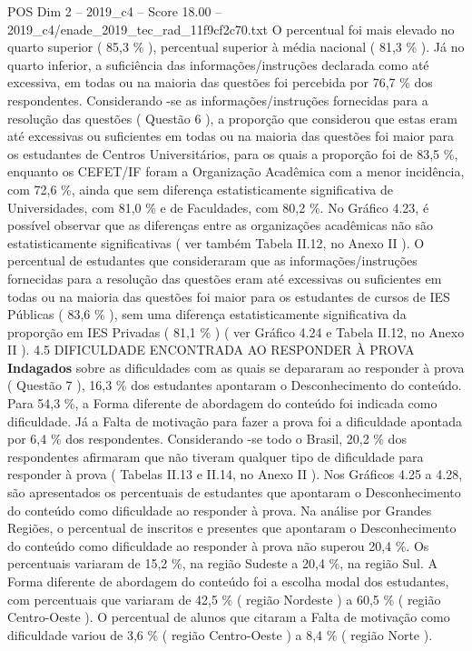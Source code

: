 \begin{textsample}{POS Dim 2 – 2019\_c4 – Score 18.00 – 2019\_c4/enade\_2019\_tec\_rad\_11f9cf2c70.txt}
O percentual foi mais elevado no quarto superior ( 85,3 \% ), percentual superior à média nacional ( 81,3 \% ).
Já no quarto inferior, a suficiência das informações/instruções declarada como até excessiva, em todas ou na maioria das questões foi percebida por 76,7 \% dos respondentes.
Considerando -se as informações/instruções fornecidas para a resolução das questões ( Questão 6 ), a proporção que considerou que estas eram até excessivas ou suficientes em todas ou na maioria das questões foi maior para os estudantes de Centros Universitários, para os quais a proporção foi de 83,5 \%, enquanto os CEFET/IF foram a Organização Acadêmica com a menor incidência, com 72,6 \%, ainda que sem diferença estatisticamente significativa de Universidades, com 81,0 \% e de Faculdades, com 80,2 \%.
No Gráfico 4.23, é possível observar que as diferenças entre as organizações acadêmicas não são estatisticamente significativas ( ver também Tabela II.12, no Anexo II ).
O percentual de estudantes que consideraram que as informações/instruções fornecidas para a resolução das questões eram até excessivas ou suficientes em todas ou na maioria das questões foi maior para os estudantes de cursos de IES Públicas ( 83,6 \% ), sem uma diferença estatisticamente significativa da proporção em IES Privadas ( 81,1 \% ) ( ver Gráfico 4.24 e Tabela II.12, no Anexo II ). 4.5 DIFICULDADE ENCONTRADA AO RESPONDER À PROVA \textbf{Indagados} sobre as dificuldades com as quais se depararam ao responder à prova ( Questão 7 ), 16,3 \% dos estudantes apontaram o Desconhecimento do conteúdo.
Para 54,3 \%, a Forma diferente de abordagem do conteúdo foi indicada como dificuldade.
Já a Falta de motivação para fazer a prova foi a dificuldade apontada por 6,4 \% dos respondentes.
Considerando -se todo o Brasil, 20,2 \% dos respondentes afirmaram que não tiveram qualquer tipo de dificuldade para responder à prova ( Tabelas II.13 e II.14, no Anexo II ).
Nos Gráficos 4.25 a 4.28, são apresentados os percentuais de estudantes que apontaram o Desconhecimento do conteúdo como dificuldade ao responder à prova.
Na análise por Grandes Regiões, o percentual de inscritos e presentes que apontaram o Desconhecimento do conteúdo como dificuldade ao responder à prova não superou 20,4 \%.
Os percentuais variaram de 15,2 \%, na região Sudeste a 20,4 \%, na região Sul.
A Forma diferente de abordagem do conteúdo foi a escolha modal dos estudantes, com percentuais que variaram de 42,5 \% ( região Nordeste ) a 60,5 \% ( região Centro-Oeste ).
O percentual de alunos que citaram a Falta de motivação como dificuldade variou de 3,6 \% ( região Centro-Oeste ) a 8,4 \% ( região Norte ).

\end{textsample}
